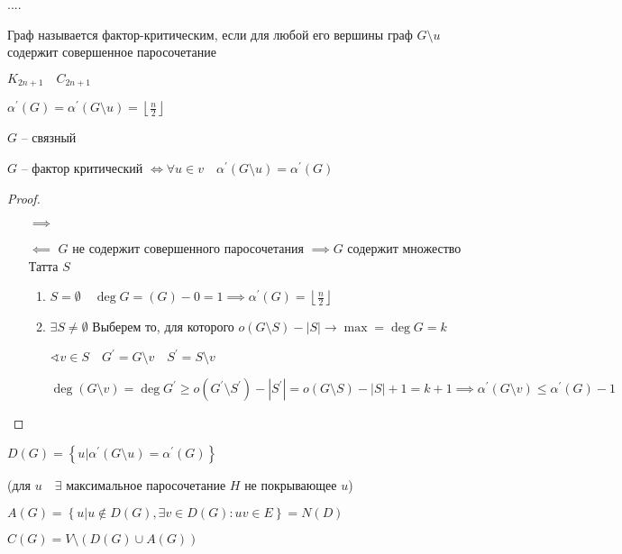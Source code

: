 \documentclass{book}
\renewcommand\O{\ensuremath{\emptyset}}
\newcommand{\p}[1]{#1^{\prime}}
\theoremstyle{definition}
\begin{document}
....


\begin{definition}
    Граф называется фактор-критическим, если для любой его вершины граф $G\setminus u$ содержит совершенное паросочетание

    $K_{2n+1}\quad C_{2n+1}$

    $\p \alpha(G) = \p \alpha(G\setminus u) = \left\lfloor \frac{n}{2} \right\rfloor$
\end{definition}

\begin{theorem}
    [Галлаи]
    $G$ -- связный 

    $G$ -- фактор критический  $\iff \forall u\in v\quad \p \alpha(G\setminus u) = \p \alpha(G)$
\end{theorem}
\begin{proof}
    \begin{itemize}
        \item []
        \item [$\implies $] \checkmark
        \item [$\impliedby $] $G$ не содержит совершенного паросочетания  $\implies G$ содержит множество Татта $S$
             \begin{enumerate}
                 \item $S = \O \quad \deg G = (G) - 0 = 1 \implies \p\alpha(G) = \left\lfloor \frac{n}{2} \right\rfloor$
                 \item $\exists S\neq \O $ Выберем то, для которого $o\left( G\setminus S \right)  - |S| \to \max = \deg G = k$

                     $\sphericalangle v\in S\quad \p G = G \setminus v\quad \p S = S \setminus v$

                     $\deg \left( G\setminus v \right)  = \deg \p G \geqslant o\left( \p G \setminus  \p S \right) - \left| \p S \right|  = o\left( G\setminus S \right)  - |S| + 1 = k +1 \implies \p \alpha(G\setminus v) \leqslant \p \alpha(G) - 1$
            \end{enumerate}
     \end{itemize}
\end{proof}

\begin{definition}
    $D(G) = \left\{ u|\p \alpha\left( G\setminus u \right) = \p \alpha(G) \right\} $

    (для $u\quad \exists $ максимальное паросочетание $H$ не покрывающее  $u$)

    $A(G) = \left\{ u|u\not\in D(G), \exists v\in D(G): uv\in E \right\} = N(D)$

    $C(G) = V \setminus \left( D(G) \cup A(G) \right) $
\end{definition}
\end{document}
